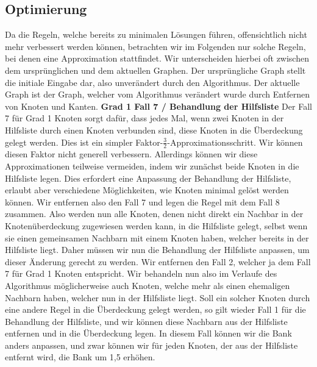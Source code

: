 \documentclass[12pt,onecolumn, notitlepage]{scrartcl}
\begin{document}
\subsection{Optimierung}
Da die Regeln, welche bereits zu minimalen Lösungen führen, offensichtlich nicht mehr verbessert werden können, betrachten wir im Folgenden nur solche Regeln, bei denen eine Approximation stattfindet. Wir unterscheiden hierbei oft zwischen dem ursprünglichen und dem aktuellen Graphen. Der ursprüngliche Graph stellt die initiale Eingabe dar, also unverändert durch den Algorithmus. Der aktuelle Graph ist der Graph, welcher vom Algorithmus verändert wurde durch Entfernen von Knoten und Kanten.\newline \newline
\textbf{Grad 1 Fall 7 / Behandlung der Hilfsliste} \newline 
Der Fall 7 für Grad 1 Knoten sorgt dafür, dass jedes Mal, wenn zwei Knoten in der Hilfsliste durch einen Knoten verbunden sind, diese Knoten in die Überdeckung gelegt werden. Dies ist ein simpler Faktor-$\frac{3}{2}$-Approximationsschritt. Wir können diesen Faktor nicht generell verbessern. Allerdings können wir diese Approximationen teilweise vermeiden, indem wir zunächst beide Knoten in die Hilfsliste legen. Dies erfordert eine Anpassung der Behandlung der Hilfsliste, erlaubt aber verschiedene Möglichkeiten, wie Knoten minimal gelöst werden können. \newline
Wir entfernen also den Fall 7 und legen die Regel mit dem Fall 8 zusammen. Also werden nun alle Knoten, denen nicht direkt ein Nachbar in der Knotenüberdeckung zugewiesen werden kann, in die Hilfsliste gelegt, selbst wenn sie einen gemeinsamen Nachbarn mit einem Knoten haben, welcher bereits in der Hilfsliste liegt. \newline
Daher müssen wir nun die Behandlung der Hilfsliste anpassen, um dieser Änderung gerecht zu werden. Wir entfernen den Fall 2, welcher ja dem Fall 7 für Grad 1 Knoten entspricht. Wir behandeln nun also im Verlaufe des Algorithmus möglicherweise auch Knoten, welche mehr als einen ehemaligen Nachbarn haben, welcher nun in der Hilfsliste liegt. Soll ein solcher Knoten durch eine andere Regel in die Überdeckung gelegt werden, so gilt wieder Fall 1 für die Behandlung der Hilfsliste, und wir können diese Nachbarn aus der Hilfsliste entfernen und in die Überdeckung legen. In diesem Fall können wir die Bank anders anpassen, und zwar können wir für jeden Knoten, der aus der Hilfsliste entfernt wird, die Bank um 1,5 erhöhen. \newline
\end{document}
